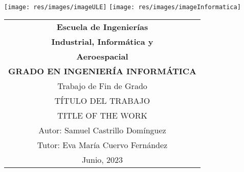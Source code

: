 \thispagestyle{empty}
\graphicspath{{./res/images/}}

\begin{table}[ht]
	\centering

	\hfill
	\\[-15ex]
	\texttt{[image: res/images/imageULE]}
	\hfill
	\texttt{[image: res/images/imageInformatica]}
	\\[25ex]

	\label{tab:coverTopCenter}
	\begin{tabular}{c}
		\LARGE\textbf{Escuela de Ingenierías}
		\\[1.5ex]

		\LARGE\textbf{Industrial, Informática y}\\
		\LARGE\textbf{Aeroespacial}
		\\[2.3ex]

		\LARGE\textbf{GRADO EN INGENIERÍA INFORMÁTICA}
		\\[10ex]

		\LARGE{Trabajo de Fin de Grado}
		\\[10ex]

		\LARGE{\uppercase{Título del trabajo}}
		\\[5ex]

		\LARGE{\uppercase{Title of the work}}
		\\[22ex]

		\hfill\large{Autor: Samuel Castrillo Domínguez}
		\\[3pt]
		\hfill\large{Tutor: Eva María Cuervo Fernández}
		\\[10ex]

		\huge{Junio, 2023}
	\end{tabular}
\end{table}

